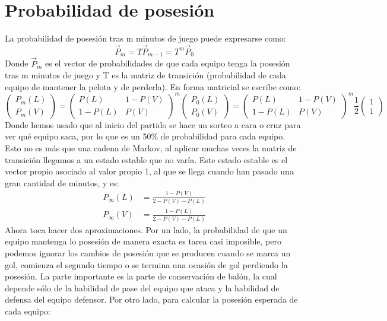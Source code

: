 \documentclass[a4paper,9pt]{article}
\begin{document}
\section{Probabilidad de posesi\'on}\label{sec:ProbPosesion}
La probabilidad de posesión tras m minutos de juego puede expresarse como:
\begin{equation}
\vec{P}_m = T\vec{P}_{m-1} = T^m\vec{P}_{0}
\end{equation}
Donde $\vec{P}_m$ es el vector de probabilidades de que cada equipo tenga la posesión tras m minutos de juego y T es la matriz de transición (probabilidad de cada equipo de mantener la pelota y de perderla). En forma matricial se escribe como:
\begin{equation}
\begin{pmatrix}
P_m(L) \\
P_m(V)
\end{pmatrix}
=
\begin{pmatrix}
P(L) & 1-P(V) \\
1-P(L) & P(V)
\end{pmatrix}^m
\begin{pmatrix}
P_0(L) \\
P_0(V)
\end{pmatrix}
=
\begin{pmatrix}
P(L) & 1-P(V) \\
1-P(L) & P(V)
\end{pmatrix}^m
\frac{1}{2}\begin{pmatrix}
1 \\
1
\end{pmatrix}
\end{equation}
Donde hemos usado que al inicio del partido se hace un sorteo a cara o cruz para ver qué equipo saca, por lo que es un 50\% de probabilidad para cada equipo. Esto no es más que una cadena de Markov, al aplicar muchas veces la matriz de transición llegamos a un estado estable que no varía. Este estado estable es el vector propio asociado al valor propio 1, al que se llega cuando han pasado una gran cantidad de minutos, y es:
\begin{align}
	P_\infty(L)&=\frac{1-P(V)}{2-P(V)-P(L)}\\
	P_\infty(V)&=\frac{1-P(L)}{2-P(V)-P(L)}
\end{align}
Ahora toca hacer dos aproximaciones. Por un lado, la probabilidad de que un equipo mantenga lo posesión de manera exacta es tarea casi imposible, pero podemos ignorar los cambios de posesión que se producen cuando se marca un gol, comienza el segundo tiempo o se termina una ocasión de gol perdiendo la posesión. La parte importante es la parte de conservación de balón, la cual depende sólo de la habilidad de pase del equipo que ataca y la habilidad de defensa del equipo defensor. Por otro lado, para calcular la posesión esperada de cada equipo:
\end{document}
